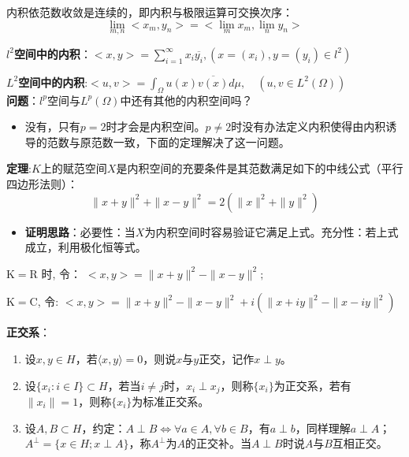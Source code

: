 \documentclass[12pt,a4paper]{article}
\begin{document}
内积依范数收敛是连续的，即内积与极限运算可交换次序：
\begin{equation}
\lim _{m, n}<x_{m}, y_{n}>=<\lim _{m} x_{m}, \lim _{n} y_{n}>
\end{equation}

\textbf{$l^2$空间中的内积}：$<x, y>=\sum_{i=1}^{\infty} x_{i} \overline{y_{i}},\left(x=\left(x_{i}\right), y=\left(y_{i}\right) \in l^{2}\right)$

\textbf{$L^2$空间中的内积}:$<u, v>=\int_{\Omega} u(x) \overline{v(x)} d \mu, \quad\left(u, v \in L^{2}(\Omega)\right)$
~\\

\textbf{问题}：$l^p$空间与$L^p(\Omega)$中还有其他的内积空间吗？
\begin{itemize}
	\item []
	没有，只有$p=2$时才会是内积空间。$p\neq 2$时没有办法定义内积使得由内积诱导的范数与原范数一致，下面的定理解决了这一问题。
\end{itemize}

\textbf{定理}:$K$上的赋范空间$X$是内积空间的充要条件是其范数满足如下的中线公式（平行四边形法则）：
\begin{equation}
\|x+y\|^{2}+\|x-y\|^{2}=2\left(\|x\|^{2}+\|y\|^{2}\right)
\end{equation}
\begin{itemize}
	\item []
	\textbf{证明思路}：必要性：当$X$为内积空间时容易验证它满足上式。充分性：若上式成立，利用极化恒等式。
\end{itemize}

$\mathrm{K}=\mathrm{R}$ 时, 令： $<x, y>=\|x+y\|^{2}-\|x-y\|^{2} ;$

$\mathrm{K}=\mathrm{C}$, 令: $<x, y>=\|x+y\|^{2}-\|x-y\|^{2}+i\left(\|x+i y\|^{2}-\|x-i y\|^{2}\right)$

\textbf{正交系}：
\begin{enumerate}
	\item 设$x,y\in H$，若$\langle x,y\rangle=0$，则说$x$与$y$正交，记作$x\perp y$。
	\item 设$\{x_i:i\in I\}\subset H$，若当$i\neq j$时，$x_i\perp x_j$，则称$\{x_i\}$为正交系，若有$\|x_i\|=1$，则称$\{x_i\}$为标准正交系。
	\item 设$A,B\subset H$，约定：$A\perp B\Leftrightarrow\forall a\in A,\forall b\in B$，有$a\perp b$，同样理解$a\perp A$；$A^{\perp}=\{x\in H;x\perp A\}$，称$A^{\perp}$为$A$的正交补。当$A\perp B$时说$A$与$B$互相正交。
\end{enumerate}
\end{document}
